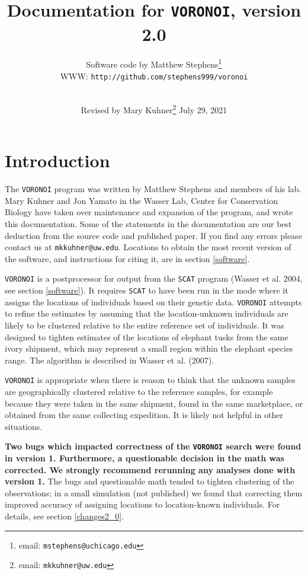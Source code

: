 \documentclass[10pt,titlepage,times,letterpaper]{article}
\def\SCAT{{\tt SCAT} }
\def\VORONOI{{\tt VORONOI} }
\begin{document}
\title{Documentation for {\tt VORONOI}, version 2.0}

\author{
Software code by Matthew Stephens\footnote{email: {\tt mstephens@uchicago.edu}} \\
WWW: {\tt http://github.com/stephens999/voronoi}\\
\\
}

\date{Revised by Mary Kuhner\footnote{email:  {\tt mkkuhner@uw.edu}} July 29, 2021}


\maketitle

\tableofcontents
\vfil\eject
\section{Introduction}
The \VORONOI program was written by Matthew Stephens and members of his lab.  Mary Kuhner
and Jon Yamato in the Wasser Lab, Center for Conservation Biology
have taken over maintenance and expansion of the program, and wrote this documentation.
Some of the statements in the documentation are our best deduction from the source code
and published paper.  If you find any errors please contact us at {\tt mkkuhner@uw.edu}.
Locations to obtain the most recent version of the software, and instructions for citing
it, are in section \ref{software}.

\VORONOI is a postprocessor for output from the \SCAT program (Wasser et al. 2004, see
section \ref{software}).
It requires \SCAT to have been run in the mode where
it assigns the locations of individuals based on their genetic data.  \VORONOI attempts
to refine the estimates by assuming that the location-unknown individuals are likely to
be clustered relative to the entire reference set of individuals.  It was designed to
tighten estimates of the locations of elephant tusks from the same ivory shipment, which
may represent a small region within the elephant species range.  The algorithm is
described in Wasser et al. (2007).

\VORONOI is appropriate when there is reason to think that the unknown samples are
geographically clustered relative to the reference samples, for example
because they were taken in the same shipment, found in the same marketplace, or
obtained from the same collecting expedition.  It is likely not helpful in other
situations.

{\bf Two bugs which impacted correctness of the \VORONOI search were found in version 1.
Furthermore, a questionable decision in the math was corrected.
We strongly recommend rerunning any analyses done with version 1.}  The bugs and
questionable math tended to tighten clustering of the observations; in a small
simulation (not published) we found that correcting them improved accuracy of
assigning locations to location-known individuals.  For details, see section \ref{changes2_0}.
\end{document}
